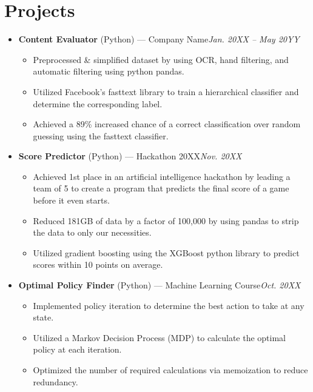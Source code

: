 \documentclass[letterpaper, 10pt]{article}
\newcommand{\project}[5]{\textbf{#1} (#2) --- #3\hfill\textit{#4}#5}
\begin{document}
\section{Projects}%
\begin{itemize}[leftmargin=0pt, noitemsep]
    \item[]
        \project
        {Content Evaluator}
        {Python}
        {Company Name}
        {Jan. 20XX -- May 20YY}
        {%
            \begin{itemize}
                \item Preprocessed \& simplified dataset by using OCR, hand
                    filtering, and automatic filtering using python pandas.
                \item Utilized Facebook's fasttext library to train a
                    hierarchical classifier and determine the corresponding
                    label.
                \item Achieved a 89\% increased chance of a correct
                    classification over random guessing using the fasttext
                    classifier.
            \end{itemize}
        }
    \medskip
    \item[]
        \project
        {Score Predictor}
        {Python}
        {Hackathon 20XX}
        {Nov. 20XX}
        {%
            \begin{itemize}
                \item Achieved 1st place in an artificial intelligence hackathon
                    by leading a team of 5 to create a program that predicts the
                    final score of a game before it even starts.
                \item Reduced 181GB of data by a factor of 100,000 by using
                    pandas to strip the data to only our necessities.
                \item Utilized gradient boosting using the XGBoost python
                    library to predict scores within 10 points on average.
            \end{itemize}
        }
    \medskip
    \item[]
        \project
        {Optimal Policy Finder}
        {Python}
        {Machine Learning Course}
        {Oct. 20XX}
        {%
            \begin{itemize}
                \item Implemented policy iteration to  determine the best action
                    to take at any state.
                \item Utilized a Markov Decision Process (MDP) to calculate the
                    optimal policy at each iteration.
                \item Optimized the number of required calculations via
                    memoization to reduce redundancy.
            \end{itemize}
        }
\end{itemize}%
\end{document}

